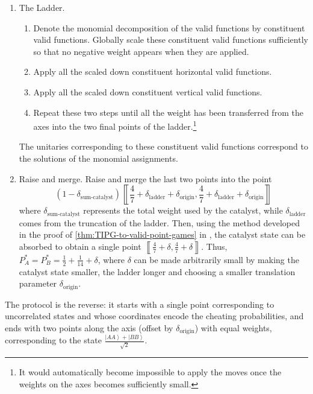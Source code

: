 \documentclass{theoretics}
\newcommand{\atul}[1]{#1} %
\newcommand{\dorigin}[0]{\delta_{\textrm{origin}}} %
\begin{document}
\begin{enumerate}
{{        smaller than that of the points along the $y$\textendash axis.}). }
  \item The Ladder.
        \begin{enumerate}
          \item Denote the monomial decomposition of the valid functions by constituent
                valid functions. Globally scale these constituent valid functions
                sufficiently so that no negative weight appears when they are applied.
          \item Apply all the scaled down constituent horizontal valid functions.
          \item Apply all the scaled down constituent vertical valid functions.
          \item Repeat these two steps until all the weight has been transferred
                from the axes into the two final points of the ladder.\footnote{It would automatically become impossible to apply the moves once the
                  weights on the axes becomes sufficiently small.}
        \end{enumerate}
        The unitaries corresponding to these constituent valid functions
        correspond to the solutions of the monomial assignments.
  \item Raise and merge. Raise and merge the last two points into \atul{the point $$(1-\delta_{\text{sum-catalyst}})\left\llbracket \frac{4}{7}+\delta_{\textrm{ladder}}+\dorigin,\frac{4}{7}+\delta_{\textrm{ladder}}+\dorigin\right\rrbracket$$}where $\delta_{\text{sum-catalyst}}$ represents the total weight used by the catalyst,
        while $\delta_{\textrm{ladder}}$ comes from the truncation of the ladder.
        Then, using the method developed in the proof of \cref{thm:TIPG-to-valid-point-games} in \cite{ACG+14,Mochon07}, the catalyst state can be absorbed to
        obtain a single point $\left\llbracket \frac{4}{7}+\delta,\frac{4}{7}+\delta\right\rrbracket $.
        Thus, $P_{A}^{*}=P_{B}^{*}=\frac{1}{2}+\frac{1}{14}+\delta$, where
        $\delta$ can be made arbitrarily small by making the
        catalyst state smaller, the ladder longer and \atul{choosing a smaller translation parameter $\dorigin$}.
\end{enumerate}
The protocol is the reverse: it starts with a single point
corresponding to uncorrelated states and whose coordinates encode the
cheating probabilities, and ends with two points along the axis \atul{(offset by $\dorigin$)} with
equal weights, corresponding to the state $\frac{\left|AA\right\rangle +\left|BB\right\rangle }{\sqrt{2}}$.
\end{document}
